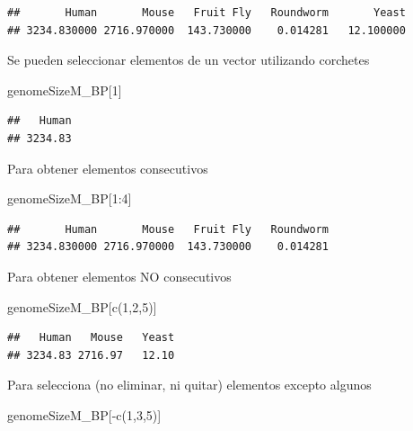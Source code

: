 \documentclass[
]{book}
\newenvironment{Shaded}{\begin{snugshade}}{\end{snugshade}}
\newcommand{\DecValTok}[1]{\textcolor[rgb]{0.00,0.00,0.81}{#1}}
\newcommand{\FunctionTok}[1]{\textcolor[rgb]{0.00,0.00,0.00}{#1}}
\newcommand{\NormalTok}[1]{#1}
\newcommand{\SpecialCharTok}[1]{\textcolor[rgb]{0.00,0.00,0.00}{#1}}
\begin{document}
\begin{verbatim}
##       Human       Mouse   Fruit Fly   Roundworm       Yeast 
## 3234.830000 2716.970000  143.730000    0.014281   12.100000
\end{verbatim}

Se pueden seleccionar elementos de un vector utilizando corchetes

\begin{Shaded}
\begin{Highlighting}[]
\NormalTok{genomeSizeM\_BP[}\DecValTok{1}\NormalTok{]}
\end{Highlighting}
\end{Shaded}

\begin{verbatim}
##   Human 
## 3234.83
\end{verbatim}

Para obtener elementos consecutivos

\begin{Shaded}
\begin{Highlighting}[]
\NormalTok{genomeSizeM\_BP[}\DecValTok{1}\SpecialCharTok{:}\DecValTok{4}\NormalTok{]}
\end{Highlighting}
\end{Shaded}

\begin{verbatim}
##       Human       Mouse   Fruit Fly   Roundworm 
## 3234.830000 2716.970000  143.730000    0.014281
\end{verbatim}

Para obtener elementos NO consecutivos

\begin{Shaded}
\begin{Highlighting}[]
\NormalTok{genomeSizeM\_BP[}\FunctionTok{c}\NormalTok{(}\DecValTok{1}\NormalTok{,}\DecValTok{2}\NormalTok{,}\DecValTok{5}\NormalTok{)]}
\end{Highlighting}
\end{Shaded}

\begin{verbatim}
##   Human   Mouse   Yeast 
## 3234.83 2716.97   12.10
\end{verbatim}

Para selecciona (no eliminar, ni quitar) elementos excepto algunos

\begin{Shaded}
\begin{Highlighting}[]
\NormalTok{genomeSizeM\_BP[}\SpecialCharTok{{-}}\FunctionTok{c}\NormalTok{(}\DecValTok{1}\NormalTok{,}\DecValTok{3}\NormalTok{,}\DecValTok{5}\NormalTok{)]}
\end{Highlighting}
\end{Shaded}
\end{document}
